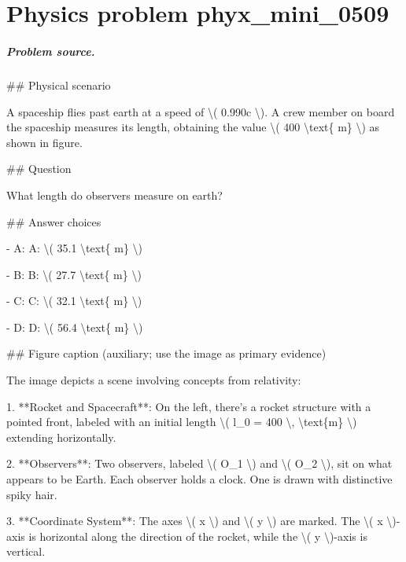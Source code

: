 
\chapter{Physics problem phyx\_mini\_0509}
\label{ch:PhyXMiniProblems_problem_phyx_mini_0509}

\paragraph{Problem source.}
\#\# Physical scenario

A spaceship flies past earth at a speed of \textbackslash{}( 0.990c \textbackslash{}). A crew member on board the spaceship measures its length, obtaining the value \textbackslash{}( 400 \textbackslash{}text\{ m\} \textbackslash{}) as shown in figure.

\#\# Question

What length do observers measure on earth?

\#\# Answer choices

- A: A: \textbackslash{}( 35.1 \textbackslash{}text\{ m\} \textbackslash{})

- B: B: \textbackslash{}( 27.7 \textbackslash{}text\{ m\} \textbackslash{})

- C: C: \textbackslash{}( 32.1 \textbackslash{}text\{ m\} \textbackslash{})

- D: D: \textbackslash{}( 56.4 \textbackslash{}text\{ m\} \textbackslash{})

\#\# Figure caption (auxiliary; use the image as primary evidence)

The image depicts a scene involving concepts from relativity:

1. **Rocket and Spacecraft**: On the left, there's a rocket structure with a pointed front, labeled with an initial length \textbackslash{}( l\_0 = 400 \textbackslash{}, \textbackslash{}text\{m\} \textbackslash{}) extending horizontally.

2. **Observers**: Two observers, labeled \textbackslash{}( O\_1 \textbackslash{}) and \textbackslash{}( O\_2 \textbackslash{}), sit on what appears to be Earth. Each observer holds a clock. One is drawn with distinctive spiky hair.

3. **Coordinate System**: The axes \textbackslash{}( x \textbackslash{}) and \textbackslash{}( y \textbackslash{}) are marked. The \textbackslash{}( x \textbackslash{})-axis is horizontal along the direction of the rocket, while the \textbackslash{}( y \textbackslash{})-axis is vertical.

